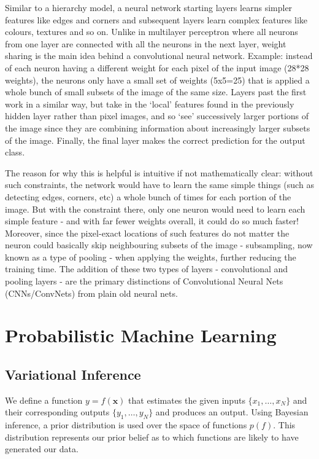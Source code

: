 Similar to a hierarchy model, a neural network starting layers learns simpler features like edges and corners and subsequent layers learn complex features like colours, textures and so on. Unlike in multilayer perceptron where all neurons from one layer are connected with all the neurons in the next layer, weight sharing is the main idea behind a convolutional neural network. 
Example: instead of each neuron having a different weight for each pixel of the input image (28*28 weights), the neurons only have a small set of weights (5x5=25) that is applied a whole bunch of small subsets of the image of the same size. Layers past the first work in a similar way, but take in the ‘local’ features found in the previously hidden layer rather than pixel images, and so ‘see’ successively larger portions of the image since they are combining information about increasingly larger subsets of the image. Finally, the final layer makes the correct prediction for the output class.

The reason for why this is helpful is intuitive if not mathematically clear: without such constraints, the network would have to learn the same simple things (such as detecting edges, corners, etc) a whole bunch of times for each portion of the image. But with the constraint there, only one neuron would need to learn each simple feature - and with far fewer weights overall, it could do so much faster! Moreover, since the pixel-exact locations of such features do not matter the neuron could basically skip neighbouring subsets of the image - subsampling, now known as a type of pooling - when applying the weights, further reducing the training time. The addition of these two types of layers - convolutional and pooling layers - are the primary distinctions of Convolutional Neural Nets (CNNs/ConvNets) from plain old neural nets.


\section{Probabilistic Machine Learning}
\subsection{Variational Inference}

We define a function $y = f(\mathbf{x})$ that estimates the given inputs $\{ x_1, \hdots, x_N \}$ and their corresponding outputs $\{y_1, \hdots, y_N\}$ and produces an output. Using Bayesian inference, a prior distribution is used over the space of functions $p(f)$. This distribution represents our prior belief as to which functions are likely to have generated our data. 

